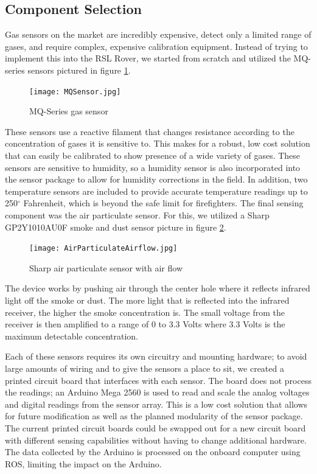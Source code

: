 \subsection{Component Selection}

Gas sensors on the market are incredibly expensive, detect only a limited range of gases, and require complex, expensive calibration equipment. Instead of trying to implement this into the RSL Rover, we started from scratch and utilized the MQ-series sensors pictured in figure \ref{fig:MQSensor}.

\begin{figure}[h!]
	\centering
	\texttt{[image: MQSensor.jpg]}
	\caption{MQ-Series gas sensor}
	\label{fig:MQSensor}
\end{figure}

These sensors use a reactive filament that changes resistance according to the concentration of gases it is sensitive to. This makes for a robust, low cost solution that can easily be calibrated to show presence of a wide variety of gases. These sensors are sensitive to humidity, so a humidity sensor is also incorporated into the sensor package to allow for humidity corrections in the field. In addition, two temperature sensors are included to provide accurate temperature readings up to 250$^{\circ}$ Fahrenheit, which is beyond the safe limit for firefighters. The final sensing component was the air particulate sensor. For this, we utilized a Sharp GP2Y1010AU0F smoke and dust sensor picture in figure \ref{fig:SmokeDetector}. 

\begin{figure}[h!]
	\centering
	\texttt{[image: AirParticulateAirflow.jpg]}
	\caption{Sharp air particulate sensor with air flow}
	\label{fig:SmokeDetector}
\end{figure}

The device works by pushing air through the center hole where it reflects infrared light off the smoke or dust. The more light that is reflected into the infrared receiver, the higher the smoke concentration is. The small voltage from the receiver is then amplified to a range of 0 to 3.3 Volts where 3.3 Volts is the maximum detectable concentration.

Each of these sensors requires its own circuitry and mounting hardware; to avoid large amounts of wiring and to give the sensors a place to sit, we created a printed circuit board that interfaces with each sensor. The board does not process the readings; an Arduino Mega 2560 is used to read and scale the analog voltages and digital readings from the sensor array. This is a low cost solution that allows for future modification as well as the planned modularity of the sensor package. The current printed circuit boards could be swapped out for a new circuit board with different sensing capabilities without having to change additional hardware. The data collected by the Arduino is processed on the onboard computer using ROS, limiting the impact on the Arduino.

